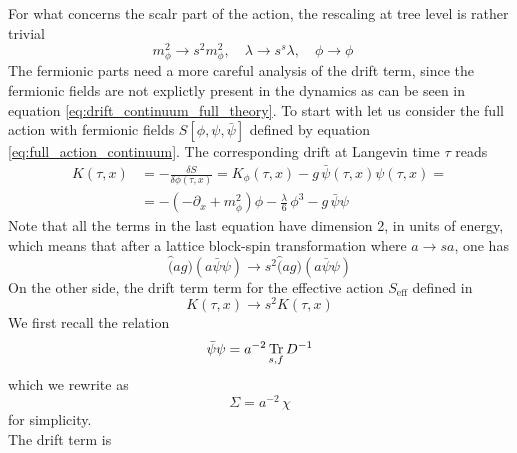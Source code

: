 For what concerns the scalr part of the action, the rescaling at tree level is rather trivial 
\begin{equation*}
    m_\phi^2 \to s^2m_{\phi}^2, \quad \lambda \to s^s\lambda, \quad \phi \to \phi \quad
\end{equation*}
The fermionic parts need a more careful analysis of the drift term, since the fermionic fields are not explictly present in the dynamics as can be seen in equation \ref{eq:drift_continuum_full_theory}. To start with let us consider the full action with fermionic fields $S[\phi, \psi, \bar\psi]$ defined by equation \eqref{eq:full_action_continuum}. 
The corresponding drift at Langevin time $\tau$ reads
\begin{equation*}
    \begin{aligned}
        K(\tau, x) &= - \frac{\delta S}{\delta \phi(\tau, x)} = K_\phi(\tau, x) - g \, \bar\psi(\tau, x)\psi(\tau,x) = \\
        &= -\left(-\partial_x + m_\phi^2\right) \phi - \frac{\lambda}{6} \, \phi^3 - g \, \bar\psi\psi
    \end{aligned}
\end{equation*}
Note that all the terms in the last equation have dimension 2, in units of energy, which means that after a lattice block-spin transformation where $a \to sa$, one has
\begin{equation*}
    \hat (ag) (a\bar\psi \psi) \to s^2 \hat (ag) (a\bar\psi \psi)
\end{equation*}
On the other side, the drift term term for the effective action $S_\text{eff}$ defined in 
\begin{equation*}
    K(\tau, x) \to s^2 K(\tau, x) 
\end{equation*}
We first recall the relation
\begin{equation*}
    \bar\psi \psi = a^{-2} \, \underset{s,f}{\operatorname{\text{Tr}}} \, D^{-1}
\end{equation*}
which we rewrite as 
\begin{equation*}
    \Sigma = a^{-2} \, \chi
\end{equation*}
for simplicity. \\
The drift term is

